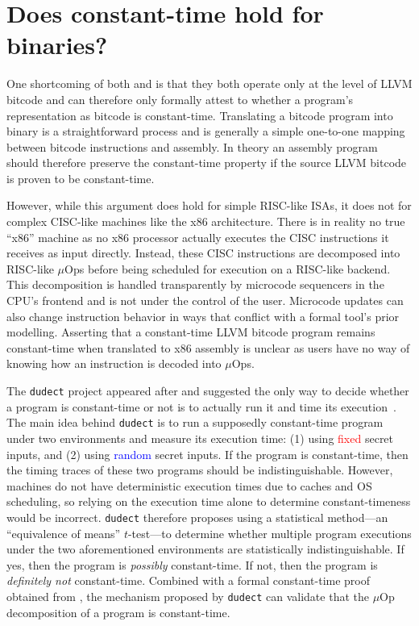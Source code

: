 \section{Does constant-time hold for binaries?}\label{sec:discussion}

One shortcoming of both \ctVerif and \kt is that they both operate only at the level of LLVM bitcode and can therefore only formally attest to whether a program's
representation as bitcode is constant-time.
Translating a bitcode program into binary is a straightforward process and is generally a simple one-to-one mapping between bitcode instructions and assembly.
In theory an assembly program should therefore preserve the constant-time property if the source LLVM bitcode is proven to be constant-time.

However, while this argument does hold for simple RISC-like ISAs, it does not for complex CISC-like machines like the x86 architecture.
There is in reality no true ``x86'' machine as no x86 processor actually executes the CISC instructions it receives as input directly.
Instead, these CISC instructions are decomposed into RISC-like $\mu$Ops before being scheduled for execution on a RISC-like backend.
This decomposition is handled transparently by microcode sequencers in the CPU's frontend and is not under the control of the user.
Microcode updates can also change instruction behavior in ways that conflict with a formal tool's prior modelling.
Asserting that a constant-time LLVM bitcode program remains constant-time when translated to x86 assembly is unclear as users have no way of knowing how an instruction is decoded into $\mu$Ops.

The \texttt{dudect} project appeared after \ctVerif and suggested the only way to decide whether a program is constant-time or not is to actually run it and time its execution~\cite{dudect}.
The main idea behind \texttt{dudect} is to run a supposedly constant-time program under two environments and measure its execution time: (1) using \textcolor{red}{fixed} secret inputs, and (2) using \textcolor{blue}{random} secret inputs.
If the program is constant-time, then the timing traces of these two programs should be indistinguishable.
However, machines do not have deterministic execution times due to caches and OS scheduling, so relying on the execution time alone to determine constant-timeness would be incorrect.
\texttt{dudect} therefore proposes using a statistical method---an ``equivalence of means'' $t$-test---to determine whether multiple program executions under the two aforementioned environments are statistically indistinguishable.
If yes, then the program is \emph{possibly} constant-time. If not, then the program is \emph{definitely not} constant-time.
Combined with a formal constant-time proof obtained from \ctVerif, the mechanism proposed by \texttt{dudect} can validate that the $\mu$Op decomposition of a program is constant-time.

